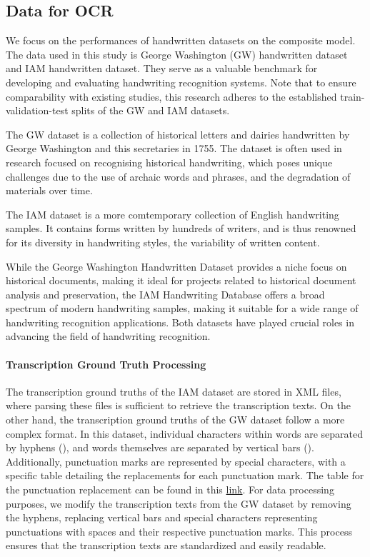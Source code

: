 \subsection{Data for OCR} 
\label{subsec:3_data_for_ocr}
We focus on the performances of handwritten datasets on the composite model. The data used in this study is George Washington (GW) handwritten dataset and IAM handwritten dataset. They serve as a valuable benchmark for developing and evaluating handwriting recognition systems. Note that to ensure comparability with existing studies, this research adheres to the established train-validation-test splits of the GW and IAM datasets. 

The GW dataset is a collection of historical letters and dairies handwritten by George Washington and this secretaries in 1755. The dataset is often used in research focused on recognising historical handwriting, which poses unique challenges due to the use of archaic words and phrases, and the degradation of materials over time.

The IAM dataset is a more comtemporary collection of English handwriting samples. It contains forms written by hundreds of writers, and is thus renowned for its diversity in handwriting styles, the variability of written content. 

While the George Washington Handwritten Dataset provides a niche focus on historical documents, making it ideal for projects related to historical document analysis and preservation, the IAM Handwriting Database offers a broad spectrum of modern handwriting samples, making it suitable for a wide range of handwriting recognition applications. Both datasets have played crucial roles in advancing the field of handwriting recognition. 
\paragraph*{Transcription Ground Truth Processing}
\label{par:3_transcription_gound_truth_processing}
The transcription ground truths of the IAM dataset are stored in XML files, where parsing these files is sufficient to retrieve the transcription texts. On the other hand, the transcription ground truths of the GW dataset follow a more complex format. In this dataset, individual characters within words are separated by hyphens (\say{ - }), and words themselves are separated by vertical bars (\say{ \textbar \;}). Additionally, punctuation marks are represented by special characters, with a specific table detailing the replacements for each punctuation mark. The table for the punctuation replacement can be found in this \href{https://github.com/Yung-Hsin-Chen/master_thesis/blob/src/model/config/punctuation_list.json}{link}. 
For data processing purposes, we modify the transcription texts from the GW dataset by removing the hyphens, replacing vertical bars and special characters representing punctuations with spaces and their respective punctuation marks. This process ensures that the transcription texts are standardized and easily readable. 
